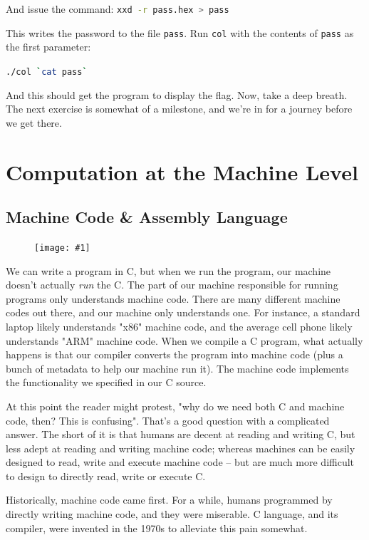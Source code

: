 \documentclass{article}
\newcommand{\wrapimageright}[1] {
    \begin{figure}
        \begin{center}
            \texttt{[image: \#1]} 
        \end{center}
    \end{figure}
}
\newcommand{\xcode}[2]{\colorbox{ubuntuback}{\lstinline[language=#1]|#2|}}
\newcommand{\code}[1]{\colorbox{ubuntuback}{\texttt{#1}}}
\begin{document}


And issue the command:
\xcode{bash}{xxd -r pass.hex > pass}

This writes the password to the file \code{pass}. Run \code{col} with the contents of \code{pass} as the first parameter:

\xcode{bash}{./col `cat pass`}

And this should get the program to display the flag. Now, take a deep breath. The next exercise is somewhat of a milestone, and we're in for a journey before we get there.

\section{Computation at the Machine Level}

\subsection{Machine Code \& Assembly Language}

\wrapimageright{./images/simple_assembly.png}
We can write a program in C, but when we run the program, our machine doesn't actually \textit{run} the C. The part of our machine responsible for running programs only understands machine code. 
There are many different machine codes out there, and our machine only understands one. For instance, a standard laptop likely understands "x86" machine code, and the average cell phone likely understands "ARM" machine code. When we compile a C program, what actually happens is that our compiler converts the program into machine code (plus a bunch of metadata to help our machine run it). The machine code implements the functionality we specified in our C source.

At this point the reader might protest, "why do we need both C and machine code, then? This is confusing". That's a good question with a complicated answer. The short of it is that humans are decent at reading and writing C, but less adept at reading and writing machine code; whereas machines can be easily designed to read, write and execute machine code -- but are much more difficult to design to directly read, write or execute C.

Historically, machine code came first. For a while, humans programmed by directly writing machine code, and they were miserable. C language, and its compiler, were invented in the 1970s to alleviate this pain somewhat.
\end{document}
